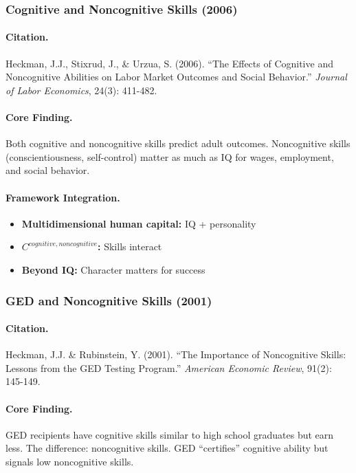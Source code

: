 \documentclass[12pt,a4paper]{article}
\begin{document}
\subsubsection{Cognitive and Noncognitive Skills (2006)}

\paragraph{Citation.}
Heckman, J.J., Stixrud, J., \& Urzua, S. (2006). ``The Effects of Cognitive
and Noncognitive Abilities on Labor Market Outcomes and Social Behavior.''
\emph{Journal of Labor Economics}, 24(3): 411-482.

\paragraph{Core Finding.}
Both cognitive and noncognitive skills predict adult outcomes.
Noncognitive skills (conscientiousness, self-control) matter as much
as IQ for wages, employment, and social behavior.

\paragraph{Framework Integration.}
\begin{itemize}
  \item \textbf{Multidimensional human capital:} IQ + personality
  \item \textbf{$C^{cognitive,noncognitive}$:} Skills interact
  \item \textbf{Beyond IQ:} Character matters for success
\end{itemize}

\subsubsection{GED and Noncognitive Skills (2001)}

\paragraph{Citation.}
Heckman, J.J. \& Rubinstein, Y. (2001). ``The Importance of Noncognitive
Skills: Lessons from the GED Testing Program.''
\emph{American Economic Review}, 91(2): 145-149.

\paragraph{Core Finding.}
GED recipients have cognitive skills similar to high school graduates
but earn less. The difference: noncognitive skills. GED ``certifies''
cognitive ability but signals low noncognitive skills.
\end{document}
